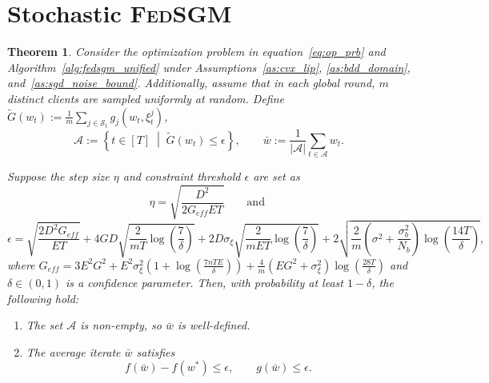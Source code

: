 \documentclass{article} %
\newtheorem{theorem}{Theorem}[]
\def\eqref#1{equation~\ref{#1}}
\def\S{{\mathcal S}}
\begin{document}
\section{Stochastic \textsc{FedSGM}}
\begin{theorem}
\label{thm:stoch_fedsgm}
Consider the optimization problem in \eqref{eq:op_prb} and Algorithm~\ref{alg:fedsgm_unified} under Assumptions~\ref{as:cvx_lip}, \ref{as:bdd_domain}, and~\ref{as:sgd_noise_bound}. Additionally, assume that in each global round, $m$ distinct clients are sampled uniformly at random. Define $\tilde{G}(w_t):=\frac{1}{m}\sum_{j \in \S_t}g_j(w_t,\xi_t^j)$, 
\[
\mathcal{A} := \left\{ t \in [T] \;\middle|\; \tilde{G}(w_t) \leq \epsilon \right\}, \qquad \bar{w} := \frac{1}{|\mathcal{A}|} \sum_{t \in \mathcal{A}} w_t.
\]

Suppose the step size $\eta$ and constraint threshold $\epsilon$ are set as
\[
\eta = \sqrt{\frac{D^2}{2G_{eff} E T}} \qquad \text{and }\]
\[
\epsilon = \sqrt{\frac{{2 D^2 G_{eff}}}{{E T}}} + 4 G D \sqrt{\frac{2}{{mT}}\log\left(\frac{7}            {\delta}\right)}
        + 2 D \sigma_\xi \sqrt{\frac{2}{mET}\log\left(\frac{7}{\delta}\right)} 
        + 2\sqrt{\frac{2}{m}\left({\sigma^2} + \frac{\sigma^2_b}{N_b}\right) \log\left(\frac{14T}{\delta}\right)},
\]
where $G_{eff} = 3 E^{2} G^{2}+ E^{2} \sigma_{\xi}^{2} \left(1 + \log\left(\frac{7 n T E}{\delta}\right)\right)+ \frac{4}{m}(EG^{2}+\sigma_{\xi}^{2}) \log\left(\frac{28 T}{\delta}\right)$ and $\delta \in (0,1)$ is a confidence parameter. Then, with probability at least $1-\delta$, the following hold:
\begin{enumerate}
    \item The set $\mathcal{A}$ is non-empty, so $\bar{w}$ is well-defined.
    \item The average iterate $\bar{w}$ satisfies
\[
f(\bar{w}) - f(w^*) \leq \epsilon, 
\qquad 
g(\bar{w}) \leq \epsilon.
\]
\end{enumerate}
\end{theorem}
\end{document}
